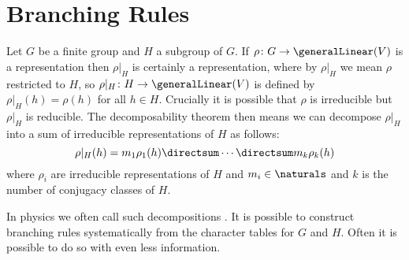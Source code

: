 \section{Branching Rules}
Let \(G\) be a finite group and \(H\) a subgroup of \(G\).
If \(\rho \colon G \to \generalLinear(V)\) is a representation then
\(\rho|_H\) is certainly a representation, where by \(\rho|_H\) we mean \(\rho\)
restricted to \(H\), so \(\rho|_H \colon H \to \generalLinear(V)\) is defined by
\(\rho|_H(h) = \rho(h)\) for all \(h \in H\).
Crucially it is possible that \(\rho\) is irreducible but \(\rho|_H\) is
reducible.
The decomposability theorem then means we can decompose \(\rho|_H\) into a
sum of irreducible representations of \(H\) as follows:
\begin{equation}
    \rho|_H(h) = m_1\rho_1(h) \directsum \dotsb \directsum m_k \rho_k(h)
\end{equation}
where \(\rho_i\) are irreducible representations of \(H\) and \(m_i \in
\naturals\) and \(k\) is the number of conjugacy classes of \(H\).

In physics we often call such decompositions .
It is possible to construct branching rules systematically from the
character tables for \(G\) and \(H\).
Often it is possible to do so with even less information.

